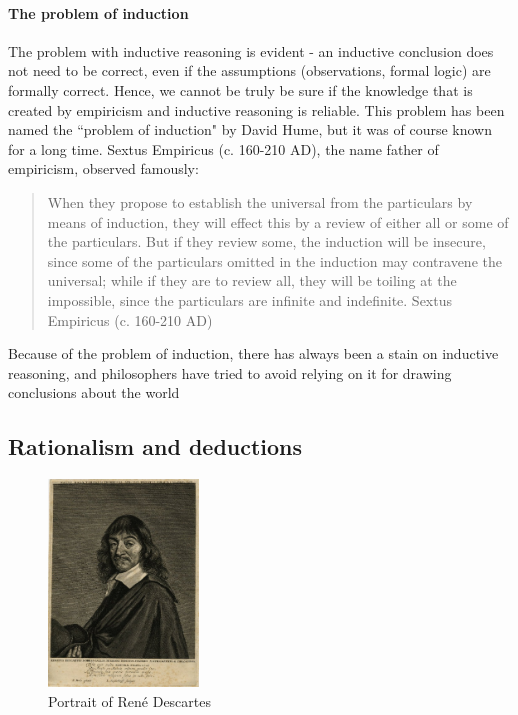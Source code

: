 \documentclass{tufte-book}
\begin{document}
\paragraph{The problem of induction}The problem with inductive reasoning is evident - an inductive conclusion does not need to be correct, even if the assumptions (observations, formal logic) are formally correct. Hence, we cannot be truly be sure if the knowledge that is created by empiricism and inductive reasoning is reliable. This problem has been named the ``problem of induction" by David Hume, but it was of course known for a long time. Sextus Empiricus (c. 160-210 AD), the name father of empiricism, observed famously:

\begin{quote}
When they propose to establish the universal from the particulars by means of induction, they will effect this by a review of either all or some of the particulars. But if they review some, the induction will be insecure, since some of the particulars omitted in the induction may contravene the universal; while if they are to review all, they will be toiling at the impossible, since the particulars are infinite and indefinite. Sextus Empiricus (c. 160-210 AD)
\end{quote}

Because of the problem of induction, there has always been a stain on inductive reasoning, and philosophers have tried to avoid relying on it for drawing conclusions about the world


\subsection{Rationalism and deductions}

\begin{figure}[]
\begin{center}
\includegraphics[width = 4cm]{figures/Descartes}
\caption{Portrait of René Descartes}
\label{fig: Descartes}
\end{center}
\end{figure}
\end{document}
